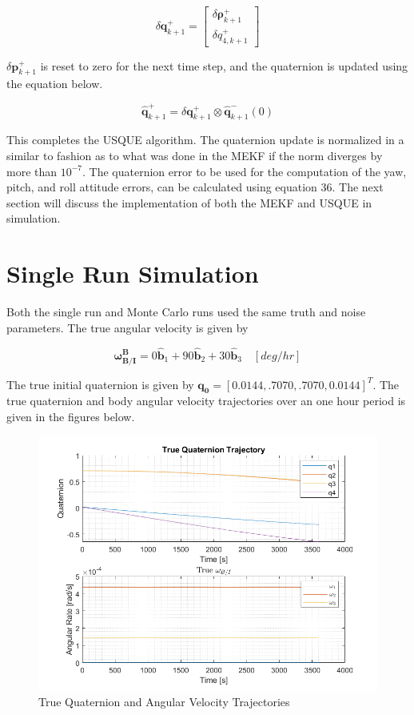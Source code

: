 \documentclass[12pt]{report}
\begin{document}
\begin{equation}
	\delta\pmb{q}_{k+1}^+  = \begin{bmatrix} 		\delta \pmb{\rho}_{k+1}^+ \\ 	\delta q_{4,k+1}^+
	\end{bmatrix}
\end{equation} 

\noindent $\delta\pmb{p}_{k+1}^+$ is reset to zero for the next time step, and the quaternion is updated using the equation below. 


\begin{equation}
	\hat{\pmb{q}}_{k+1}^+ = \delta\pmb{q}_{k+1}^+ \otimes \hat{\pmb{q}}_{k+1}^-(0)
\end{equation} 

\noindent This completes the USQUE algorithm. The quaternion update is normalized in a similar to fashion as to what was done in the MEKF if the norm diverges by more than $10^{-7}$. The quaternion error to be used for the computation of the yaw, pitch, and roll attitude errors, can be calculated using equation 36. The next section will discuss the implementation of both the MEKF and USQUE in simulation.

\section*{Single Run Simulation }
\noindent Both the single run and Monte Carlo runs used the same truth and noise parameters. The true angular velocity is given by

\begin{equation}
	\pmb{\omega_{B/I}^B} = 0 \hat{\pmb{b}}_1 + 90 \hat{\pmb{b}}_2 + 30 \hat{\pmb{b}}_3 \quad [deg/hr]
\end{equation} 

\noindent The true initial quaternion is given by $\pmb{q_0} = [0.0144, .7070, .7070, 0.0144]^T$. The true quaternion and body angular velocity trajectories over an one hour period is given in the figures below. 
\newpage

\begin{figure}[h!]
	\centering
	\includegraphics[width = .8\textwidth]{Truth.png}
	\caption{True Quaternion and Angular Velocity Trajectories}
	\label{fig:Part B}
\end{figure}
\end{document}

